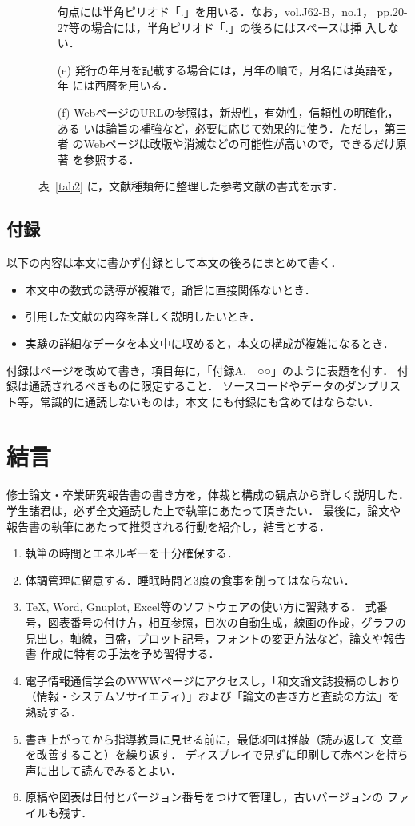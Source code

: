 \documentclass[main]{subfiles}
\begin{document}
\begin{description}
\begin{itemize}
	   句点には半角ピリオド「.」を用いる．なお，vol.J62-B，no.1，
	   pp.20-27等の場合には，半角ピリオド「.」の後ろにはスペースは挿
	   入しない．
\item[(e)] 発行の年月を記載する場合には，月年の順で，月名には英語を，年
	   には西暦を用いる．
\item[(f)] WebページのURLの参照は，新規性，有効性，信頼性の明確化，ある
	   いは論旨の補強など，必要に応じて効果的に使う．ただし，第三者
	   のWebページは改版や消滅などの可能性が高いので，できるだけ原著
	   を参照する．
\end{itemize}
表~\ref{tab2} に，文献種類毎に整理した参考文献の書式を示す．
\end{description}



\section{付録}
以下の内容は本文に書かず付録として本文の後ろにまとめて書く．

\begin{itemize}
\item 本文中の数式の誘導が複雑で，論旨に直接関係ないとき．
\item 引用した文献の内容を詳しく説明したいとき．
\item 実験の詳細なデータを本文中に収めると，本文の構成が複雑になるとき．
\end{itemize}

付録はページを改めて書き，項目毎に，「付録A.　○○」のように表題を付す．
付録は通読されるべきものに限定すること．
ソースコードやデータのダンプリスト等，常識的に通読しないものは，本文
にも付録にも含めてはならない．

\chapter{結言}
修士論文・卒業研究報告書の書き方を，体裁と構成の観点から詳しく説明した．
学生諸君は，必ず全文通読した上で執筆にあたって頂きたい． 
最後に，論文や報告書の執筆にあたって推奨される行動を紹介し，結言とする．

\begin{enumerate}
\item 執筆の時間とエネルギーを十分確保する．
\item 体調管理に留意する．睡眠時間と3度の食事を削ってはならない．
\item \TeX, Word, Gnuplot, Excel等のソフトウェアの使い方に習熟する．
式番号，図表番号の付け方，相互参照，目次の自動生成，線画の作成，グラフの
見出し，軸線，目盛，プロット記号，フォントの変更方法など，論文や報告書
作成に特有の手法を予め習得する．
\item 電子情報通信学会のWWWページにアクセスし，「和文論文誌投稿のしおり
（情報・システムソサイエティ）」および「論文の書き方と査読の方法」を熟読する．
\item 書き上がってから指導教員に見せる前に，最低3回は推敲（読み返して
文章を改善すること）を繰り返す．
ディスプレイで見ずに印刷して赤ペンを持ち声に出して読んでみるとよい．
\item 原稿や図表は日付とバージョン番号をつけて管理し，古いバージョンの
ファイルも残す．
\end{enumerate}
\end{document}
